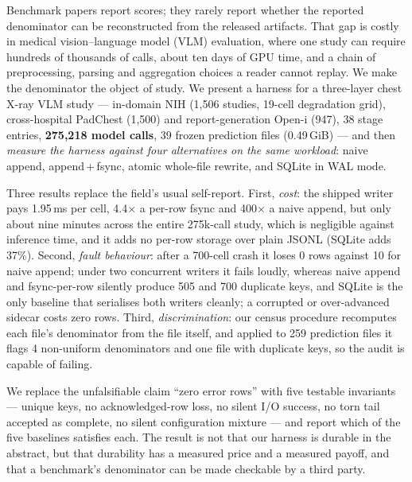 Benchmark papers report scores; they rarely report whether the reported denominator can be reconstructed from the released artifacts. That gap is costly in medical vision--language model (VLM) evaluation, where one study can require hundreds of thousands of calls, about ten days of GPU time, and a chain of preprocessing, parsing and aggregation choices a reader cannot replay. We make the denominator the object of study. We present a harness for a three-layer chest X-ray VLM study --- in-domain NIH (1,506 studies, 19-cell degradation grid), cross-hospital PadChest (1,500) and report-generation Open-i (947), 38 stage entries, \textbf{275,218 model calls}, 39 frozen prediction files (0.49\,GiB) --- and then \emph{measure the harness against four alternatives on the same workload}: naive append, append\,+\,fsync, atomic whole-file rewrite, and SQLite in WAL mode.

Three results replace the field's usual self-report. First, \emph{cost}: the shipped writer pays 1.95\,ms per cell, 4.4$\times$ a per-row fsync and 400$\times$ a naive append, but only about nine minutes across the entire 275k-call study, which is negligible against inference time, and it adds no per-row storage over plain JSONL (SQLite adds 37\%). Second, \emph{fault behaviour}: after a 700-cell crash it loses 0 rows against 10 for naive append; under two concurrent writers it fails loudly, whereas naive append and fsync-per-row silently produce 505 and 700 duplicate keys, and SQLite is the only baseline that serialises both writers cleanly; a corrupted or over-advanced sidecar costs zero rows. Third, \emph{discrimination}: our census procedure recomputes each file's denominator from the file itself, and applied to 259 prediction files it flags 4 non-uniform denominators and one file with duplicate keys, so the audit is capable of failing.

We replace the unfalsifiable claim ``zero error rows'' with five testable invariants --- unique keys, no acknowledged-row loss, no silent I/O success, no torn tail accepted as complete, no silent configuration mixture --- and report which of the five baselines satisfies each. The result is not that our harness is durable in the abstract, but that durability has a measured price and a measured payoff, and that a benchmark's denominator can be made checkable by a third party.
